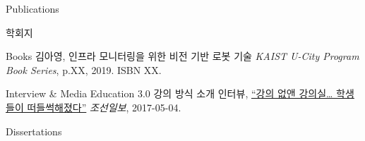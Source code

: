 \begin{rSection}{Publications}
{\begin{pubSubsectionNum}{학회지}
  \end{pubSubsectionNum}

  \begin{pubSubsectionNum}{Books}
    김아영,
    인프라 모니터링을 위한 비전 기반 로봇 기술
    \textit{KAIST U-City Program Book Series}, p.XX, 2019. ISBN XX.

  \end{pubSubsectionNum}

  \begin{pubSubsectionNum}{Interview \& Media}
    Education 3.0 강의 방식 소개 인터뷰,
    \hyperlink{http://news.chosun.com/site/data/html_dir/2017/05/04/2017050400133.html}{``강의 없앤 강의실… 학생들이 떠들썩해졌다''}
    \textit{조선일보}, 2017-05-04.

  \end{pubSubsectionNum}
}

\begin{pubSubsectionNum}{Dissertations}
  \item {}
  \item {}
\end{pubSubsectionNum}


\end{rSection}
